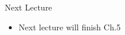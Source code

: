 \documentclass[aspectratio=1610]{beamer}
\begin{document}
%

\begin{frame}[wide]{Next Lecture}
	\begin{itemize}
		\item Next lecture will finish Ch.5 %
	\end{itemize}
\end{frame}
\end{document}
